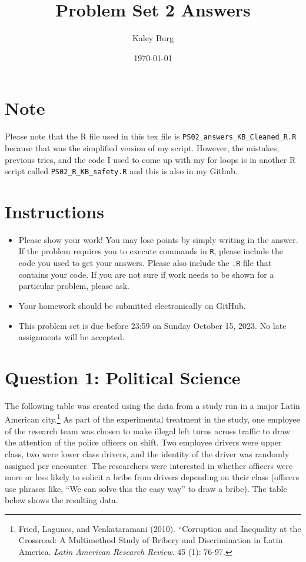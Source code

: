 \documentclass[12pt,letterpaper]{article}
\title{Problem Set 2 Answers}
\date{\today}
\author{Kaley Burg}
\begin{document}
	\maketitle
	\section*{Note}
		Please note that the R file used in this tex file is \texttt{PS02\_answers\_KB\_Cleaned\_R.R} because that was the simplified version of my script. However, the mistakes, previous tries, and the code I used to come up with my for loops is in another R script called \texttt{PS02\_R\_KB\_safety.R}
		 and this is also in my Github. 
	\section*{Instructions}
\begin{itemize}
	\item Please show your work! You may lose points by simply writing in the answer. If the problem requires you to execute commands in \texttt{R}, please include the code you used to get your answers. Please also include the \texttt{.R} file that contains your code. If you are not sure if work needs to be shown for a particular problem, please ask.
	\item Your homework should be submitted electronically on GitHub.
	\item This problem set is due before 23:59 on Sunday October 15, 2023. No late assignments will be accepted.

\end{itemize}

	
	\vspace{.5cm}
	\section*{Question 1: Political Science}
		\vspace{.25cm}
	The following table was created using the data from a study run in a major Latin American city.\footnote{Fried, Lagunes, and Venkataramani (2010). ``Corruption and Inequality at the Crossroad: A Multimethod Study of Bribery and Discrimination in Latin America. \textit{Latin American Research Review}. 45 (1): 76-97.} As part of the experimental treatment in the study, one employee of the research team was chosen to make illegal left turns across traffic to draw the attention of the police officers on shift. Two employee drivers were upper class, two were lower class drivers, and the identity of the driver was randomly assigned per encounter. The researchers were interested in whether officers were more or less likely to solicit a bribe from drivers depending on their class (officers use phrases like, ``We can solve this the easy way'' to draw a bribe). The table below shows the resulting data.
\end{document}
